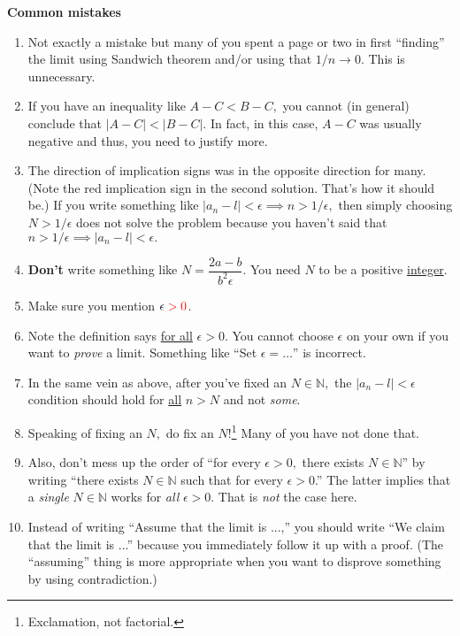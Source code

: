 \documentclass[12pt]{article}
\theoremstyle{definition}
\newcommand{\md}[1]{\left\lvert #1 \right\lvert}
\begin{document}
\newpage
\textbf{Common mistakes}
\begin{enumerate}
	\item Not exactly a mistake but many of you spent a page or two in first ``finding'' the limit using Sandwich theorem and/or using that $1/n \to 0.$ This is unnecessary. 
	\item If you have an inequality like $A - C < B - C,$ you cannot (in general) conclude that $\md{A - C} < \md{B - C}.$ In fact, in this case, $A - C$ was usually negative and thus, you need to justify more.
	\item The direction of implication signs was in the opposite direction for many. (Note the red implication sign in the second solution. That's how it should be.) If you write something like $\md{a_n - l} < \epsilon \implies n > 1/\epsilon,$ then simply choosing $N > 1/\epsilon$ does not solve the problem because you haven't said that $n > 1/\epsilon \implies \md{a_n - l} < \epsilon.$
	\item \textbf{Don't} write something like $N = \dfrac{2a - b}{b^2\epsilon}.$ You need $N$ to be a positive \underline{integer}.
	\item Make sure you mention $\epsilon {\color{red}\;> 0}$.
	\item Note the definition says \underline{for all} $\epsilon > 0.$ You cannot choose $\epsilon$ on your own if you want to \emph{prove} a limit. Something like ``Set $\epsilon = \ldots$'' is incorrect.
	\item In the same vein as above, after you've fixed an $N \in \mathbb{N},$ the $\md{a_n - l} < \epsilon$ condition should hold for \underline{all} $n > N$ and not \emph{some}.
	\item Speaking of fixing an $N,$ do fix an $N$!\footnote{Exclamation, not factorial.} Many of you have not done that.
	\item Also, don't mess up the order of ``for every $\epsilon > 0,$ there exists $N \in \mathbb{N}$'' by writing ``there exists $N \in \mathbb{N}$ such that for every $\epsilon > 0$.'' The latter implies that a \emph{single} $N \in \mathbb{N}$ works for \emph{all} $\epsilon > 0.$ That is \emph{not} the case here.
	\item Instead of writing ``Assume that the limit is ...,'' you should write ``We claim that the limit is ...'' because you immediately follow it up with a proof. (The ``assuming'' thing is more appropriate when you want to disprove something by using contradiction.)
\end{enumerate}
\end{document}
